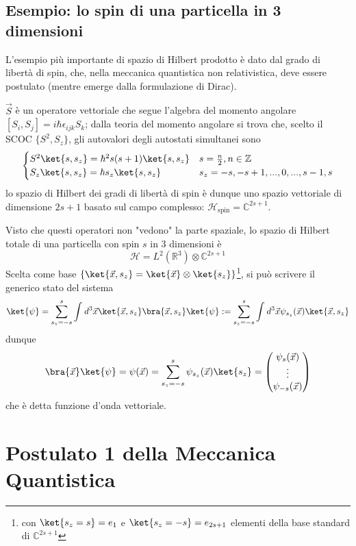 \subsection{Esempio: lo spin di una particella in 3 dimensioni}
L'esempio più importante di spazio di Hilbert prodotto è dato dal grado di libertà di spin,
che, nella meccanica quantistica non relativistica, deve essere postulato (mentre emerge dalla
formulazione di Dirac).

$\vec{S}$ è un operatore vettoriale che segue l'algebra del momento angolare
$[S_i,S_j] = i\hbar\epsilon_{ijk}S_k$; dalla teoria del momento angolare si trova che, scelto il SCOC
$\{S^2,S_z\}$, gli autovalori degli autostati simultanei sono
$$
\begin{cases}
    S^2\ket{s,s_z} = \hbar^2s(s+1)\ket{s,s_z} & s = \frac{n}{2}, n\in\mathbb{Z} \\
    S_z\ket{s,s_z} = \hbar s_z\ket{s,s_z} & s_z = -s,-s+1,...,0,...,s-1,s\\
\end{cases}
$$
lo spazio di Hilbert dei gradi di libertà di spin è dunque uno spazio vettoriale di dimensione
$2s+1$ basato sul campo complesso: $\mathcal{H}_\text{spin} = \mathbb{C}^{2s+1}$.

Visto che questi operatori non "vedono" la parte spaziale, lo spazio di Hilbert totale di una
particella con spin $s$ in 3 dimensioni è
$$ \mathcal{H} = L^2(\mathbb{R}^3) \otimes \mathbb{C}^{2s+1}$$
Scelta come base $\{ \ket{\vec{x},s_z} = \ket{\vec{x}}\otimes\ket{s_z} \}$\footnote{con
$\ket{s_z = s} = e_1$ e $\ket{s_z=-s} = e_{2s+1}$ elementi della base standard di $\mathbb{C}^{2s+1}$},
si può scrivere il generico stato del sistema
$$\ket{\psi} = \sum_{s_z=-s}^{s}\int_{}^{}d^3\vec{x} \ket{\vec{x},s_z}\bra{\vec{x},s_z}\ket{\psi}
:= \sum_{s_z=-s}^{s}\int_{}^{}d^3\vec{x} \psi_{s_z}(\vec{x})\ket{\vec{x},s_z}$$
dunque
$$ \bra{\vec{x}}\ket{\psi}=\psi(\vec{x}) = \sum_{s_z=-s}^{s}\psi_{s_z}(\vec{x})\ket{s_z} =
    \begin{pmatrix}
	\psi_s(\vec{x}) \\
	\vdots \\
	\psi_{-s}(\vec{x})
    \end{pmatrix}$$
che è detta funzione d'onda vettoriale.

\section{Postulato 1 della Meccanica Quantistica}
\noindent{}

